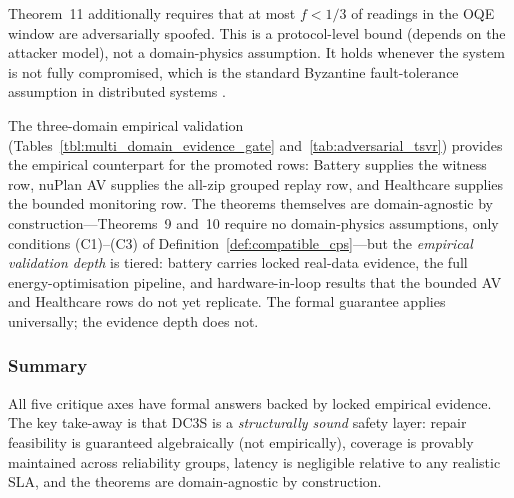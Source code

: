 Theorem~11 additionally requires that at most $f < 1/3$ of readings in the OQE window
are adversarially spoofed.  This is a protocol-level bound (depends on the attacker
model), not a domain-physics assumption.  It holds whenever the system is not fully
compromised, which is the standard Byzantine fault-tolerance assumption in distributed
systems \cite{lamport1982byzantine}.

The three-domain empirical validation (Tables~\ref{tbl:multi_domain_evidence_gate}
and~\ref{tab:adversarial_tsvr}) provides the empirical counterpart for the
promoted rows: Battery supplies the witness row, nuPlan AV supplies the
all-zip grouped replay row, and Healthcare supplies the bounded monitoring row.
The theorems themselves are domain-agnostic by construction---Theorems~9 and~10
require no domain-physics assumptions, only conditions (C1)--(C3) of
Definition~\ref{def:compatible_cps}---but the \emph{empirical validation depth}
is tiered: battery carries locked real-data evidence, the full energy-optimisation
pipeline, and hardware-in-loop results that the bounded AV and Healthcare rows do not yet replicate.
The formal guarantee applies universally; the evidence depth does not.

\subsubsection*{Summary}

All five critique axes have formal answers backed by locked empirical evidence.
The key take-away is that DC3S is a \emph{structurally sound} safety layer:
repair feasibility is guaranteed algebraically (not empirically), coverage is
provably maintained across reliability groups, latency is negligible relative to
any realistic SLA, and the theorems are domain-agnostic by construction.
